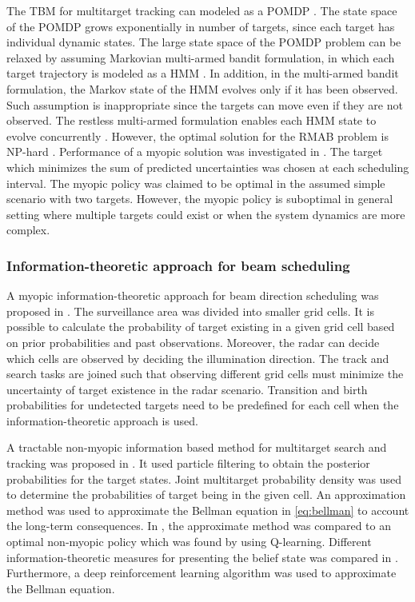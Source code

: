 \documentclass[english, 12pt, a4paper, elec, utf8, a-1b, online]{aaltothesis}
\begin{document}
The TBM for multitarget tracking can modeled as a POMDP \cite{Krishnamurthy1999, Krishnamurthy2001, Scala2006}.
The state space of the POMDP grows exponentially in number of targets, since each target has individual dynamic states.
The large state space of the POMDP problem can be relaxed by assuming Markovian multi-armed bandit formulation, in which each target trajectory is modeled as a HMM \cite{Krishnamurthy1999, Krishnamurthy2001}.
In addition, in the multi-armed bandit formulation, the Markov state of the HMM evolves only if it has been observed.
Such assumption is inappropriate since the targets can move even if they are not observed.
The restless multi-armed formulation enables each HMM state to evolve concurrently \cite{Scala2006}.
However, the optimal solution for the RMAB problem is NP-hard \cite{Guha2007}.
Performance of a myopic solution was investigated in \cite{Scala2006}.
The target which minimizes the sum of predicted uncertainties was chosen at each scheduling interval.
The myopic policy was claimed to be optimal in the assumed simple scenario with two targets.
However, the myopic policy is suboptimal in general setting where multiple targets could exist or when the system dynamics are more complex.

\subsubsection{Information-theoretic approach for beam scheduling} \label{sec:inf_based}

A myopic information-theoretic approach for beam direction scheduling was proposed in \cite{Kastella1997}.
The surveillance area was divided into smaller grid cells.
It is possible to calculate the probability of target existing in a given grid cell based on prior probabilities and past observations. 
Moreover, the radar can decide which cells are observed by deciding the illumination direction.
The track and search tasks are joined such that observing different grid cells must minimize the uncertainty of target existence in the radar scenario.
Transition and birth probabilities for undetected targets need to be predefined for each cell when the information-theoretic approach is used.

A tractable non-myopic information based method for multitarget search and tracking was proposed in \cite{Kreucher2004}.
It used particle filtering to obtain the posterior probabilities for the target states.
Joint multitarget probability density was used to determine the probabilities of target being in the given cell.
An approximation method was used to approximate the Bellman equation in \eqref{eq:bellman} to account the long-term consequences. 
In \cite{Kreucher2005}, the approximate method was compared to an optimal non-myopic policy which was found by using Q-learning.
Different information-theoretic measures for presenting the belief state was compared in \cite{Xu2010}.
Furthermore, a deep reinforcement learning algorithm was used to approximate the Bellman equation.
\end{document}
